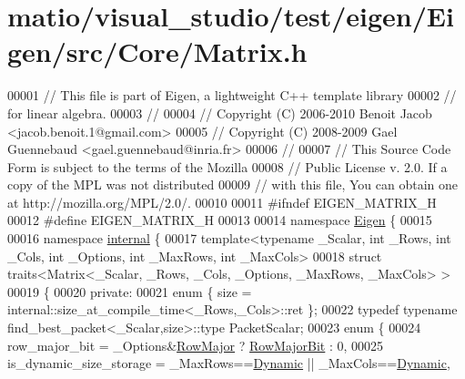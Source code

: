 \hypertarget{matio_2visual__studio_2test_2eigen_2_eigen_2src_2_core_2_matrix_8h_source}{}\section{matio/visual\+\_\+studio/test/eigen/\+Eigen/src/\+Core/\+Matrix.h}
\label{matio_2visual__studio_2test_2eigen_2_eigen_2src_2_core_2_matrix_8h_source}

\begin{DoxyCode}
00001 \textcolor{comment}{// This file is part of Eigen, a lightweight C++ template library}
00002 \textcolor{comment}{// for linear algebra.}
00003 \textcolor{comment}{//}
00004 \textcolor{comment}{// Copyright (C) 2006-2010 Benoit Jacob <jacob.benoit.1@gmail.com>}
00005 \textcolor{comment}{// Copyright (C) 2008-2009 Gael Guennebaud <gael.guennebaud@inria.fr>}
00006 \textcolor{comment}{//}
00007 \textcolor{comment}{// This Source Code Form is subject to the terms of the Mozilla}
00008 \textcolor{comment}{// Public License v. 2.0. If a copy of the MPL was not distributed}
00009 \textcolor{comment}{// with this file, You can obtain one at http://mozilla.org/MPL/2.0/.}
00010 
00011 \textcolor{preprocessor}{#ifndef EIGEN\_MATRIX\_H}
00012 \textcolor{preprocessor}{#define EIGEN\_MATRIX\_H}
00013 
00014 \textcolor{keyword}{namespace }\hyperlink{namespace_eigen}{Eigen} \{
00015 
00016 \textcolor{keyword}{namespace }\hyperlink{namespaceinternal}{internal} \{
00017 \textcolor{keyword}{template}<\textcolor{keyword}{typename} \_Scalar, \textcolor{keywordtype}{int} \_Rows, \textcolor{keywordtype}{int} \_Cols, \textcolor{keywordtype}{int} \_Options, \textcolor{keywordtype}{int} \_MaxRows, \textcolor{keywordtype}{int} \_MaxCols>
00018 \textcolor{keyword}{struct }traits<Matrix<\_Scalar, \_Rows, \_Cols, \_Options, \_MaxRows, \_MaxCols> >
00019 \{
00020 \textcolor{keyword}{private}:
00021   \textcolor{keyword}{enum} \{ size = internal::size\_at\_compile\_time<\_Rows,\_Cols>::ret \};
00022   \textcolor{keyword}{typedef} \textcolor{keyword}{typename} find\_best\_packet<\_Scalar,size>::type PacketScalar;
00023   \textcolor{keyword}{enum} \{
00024       row\_major\_bit = \_Options&\hyperlink{group__enums_ggaacded1a18ae58b0f554751f6cdf9eb13acfcde9cd8677c5f7caf6bd603666aae3}{RowMajor} ? \hyperlink{group__flags_gae4f56c2a60bbe4bd2e44c5b19cbe8762}{RowMajorBit} : 0,
00025       is\_dynamic\_size\_storage = \_MaxRows==\hyperlink{namespace_eigen_ad81fa7195215a0ce30017dfac309f0b2}{Dynamic} || \_MaxCols==\hyperlink{namespace_eigen_ad81fa7195215a0ce30017dfac309f0b2}{Dynamic},

\end{DoxyCode}
